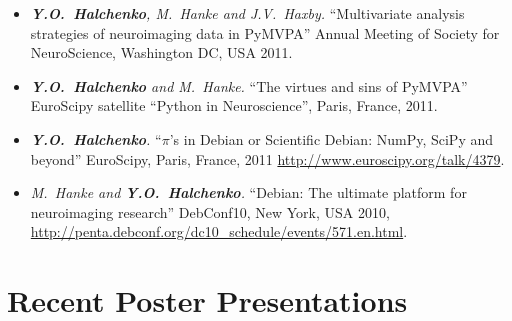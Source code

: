 \documentclass[12pt,overlapped,line]{res}
\newcommand{\mtitle}[1]{``#1''}
\newcommand{\mauthors}[1]{ \textit{#1.}}
\newcommand{\mwhere}[1]{#1.}
\begin{document}
\begin{resume}
 \begin{itemize}

 \item
   \mauthors{\textbf{Y.O.~Halchenko}, M.~Hanke and J.V.~Haxby}
   \mtitle{Multivariate analysis strategies of neuroimaging data in PyMVPA}
   \mwhere{Annual Meeting of Society for NeuroScience, Washington DC,  USA 2011}

 \item
   \mauthors{\textbf{Y.O.~Halchenko} and M.~Hanke}
   \mtitle{The virtues and sins of PyMVPA}
   \mwhere{EuroScipy satellite ``Python in Neuroscience'', Paris, France, 2011}


 \item
   \mauthors{\textbf{Y.O.~Halchenko}}
   \mtitle{$\pi$'s in Debian or Scientific Debian: NumPy, SciPy and beyond}
   \mwhere{EuroScipy, Paris, France, 2011
     \url{http://www.euroscipy.org/talk/4379}}

 \item
   \mauthors{M.~Hanke and \textbf{Y.O.~Halchenko}}
   \mtitle{Debian: The ultimate platform for neuroimaging
     research}
   \mwhere{DebConf10, New York, USA 2010,
     \url{http://penta.debconf.org/dc10_schedule/events/571.en.html}}


%
%
%
%
 \end{itemize}

\section{Recent Poster Presentations }


\end{resume}
\end{document}
